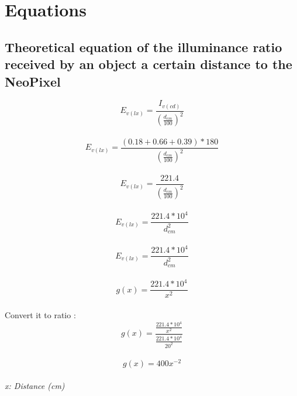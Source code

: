 \chapter{Equations}\label{appendix_equation}
\section{Theoretical equation of the illuminance ratio received by an object a certain distance to the NeoPixel}
{
	\centering	
	\[E_{v(lx)}=\frac{I_{v(cd)}}{(\frac{d_{cm}}{100})^2}\]	\\
	\[E_{v(lx)}=\frac{(0.18+0.66+0.39)*180}{(\frac{d_{cm}}{100})^2}\]	\\
	\[E_{v(lx)}=\frac{221.4}{(\frac{d_{cm}}{100})^2}\]	\\
	\[E_{v(lx)}=\frac{221.4*10^{4}}{d_{cm}^2}\]	\\
	\[E_{v(lx)}=\frac{221.4*10^{4}}{d_{cm}^2}\]	\\
	\[g(x)=\frac{221.4*10^{4}}{x^2}\]	\\
	Convert it to ratio :\\
	\[g(x) = \frac{\frac{221.4*10^{4}}{x^2}}{\frac{221.4*10^{4}}{20^2}}\]\\
	\[g(x) = 400x^{-2}\]\\
	\textit{x: Distance (cm)}
}